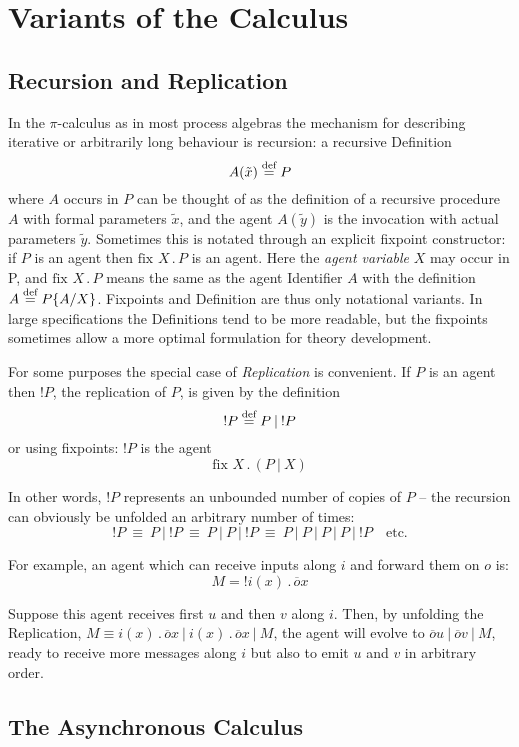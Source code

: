 \documentclass[10pt,a4paper]{article}
\newcommand{\outp}[2]{\overline{#1}#2}
\newcommand{\inpp}[2]{#1(#2)}
\newcommand{\prefix}[2]{{#1}\,.\,#2}
\newcommand{\inp}[3]{\prefix{\inpp{#1}{#2}}{#3}}
\newcommand{\defi}{\buildrel \text{def}\over =}
\newcommand{\para}{\:|\:}
\newcommand{\fix}[2]{\text{fix }#1\,.\,#2}
\begin{document}
\section{Variants of the Calculus}

\subsection{Recursion and Replication}

In the $\pi$-calculus as in most process algebras the mechanism for describing iterative or arbitrarily long behaviour is recursion: a recursive Definition
\[
A(\tilde{x}) \defi P
\]
where $A$ occurs in $P$ can be thought of as the definition of a recursive procedure $A$ with formal parameters $\tilde{x}$, and the agent $A(\tilde{y})$ is the invocation with actual parameters $\tilde{y}$. Sometimes this is notated through an explicit fixpoint constructor: if $P$ is an agent then $\fix{X}{P}$ is an agent. Here the \emph{agent variable} $X$ may occur in P, and $\fix{X}{P}$ means the same as the agent Identifier $A$ with the definition $A \defi P\{A/X\}$. Fixpoints and Definition are thus only notational variants. In large specifications the Definitions tend to be more readable, but the fixpoints sometimes allow a more optimal formulation for theory development.

For some purposes the special case of \emph{Replication} is convenient. If $P$ is an agent then $!P$, the replication of $P$, is given by the definition
\[
!P \defi P \para !P
\]
or using fixpoints: $!P$ is the agent
\[
\fix{X}{(P \para X)}
\]

In other words, $!P$ represents an unbounded number of copies of $P$ -- the recursion can obviously be unfolded an arbitrary number of times: 
\[
!P \:\equiv\: P \para !P \:\equiv\: P \para P \para !P \:\equiv\: P \para P \para P \para P \para !P \quad \text{etc.}
\]

For example, an agent which can receive inputs along $i$ and forward them on $o$ is:
\[
M = !\inp{i}{x}{\outp{o}{x}}
\]

Suppose this agent receives first $u$ and then $v$ along $i$. Then, by unfolding the Replication, $M \equiv \inp{i}{x}{\outp{o}{x}} \para \inp{i}{x}{\outp{o}{x}} \para M$, the agent will evolve to $\outp{o}{u} \para \outp{o}{v} \para M$, ready to receive more messages along $i$ but also to emit $u$ and $v$ in arbitrary order.

\subsection{The Asynchronous Calculus}
\end{document}
